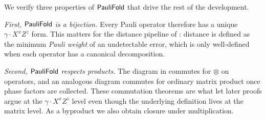%
%
%

We verify three properties of $\mathsf{PauliFold}$ that drive the rest of the
development.

\emph{First, $\mathsf{PauliFold}$ is a bijection.} Every Pauli operator therefore has a
unique $\gamma \cdot X^x Z^z$ form. This matters for the distance pipeline of
: distance is defined as the minimum \emph{Pauli weight}
of an undetectable error, which is only well-defined when each operator has a
canonical decomposition.

\emph{Second, $\mathsf{PauliFold}$ respects products.} The diagram in
 commutes for $\otimes$ on operators, and an analogous
diagram commutes for ordinary matrix product once phase factors are collected.
These commutation theorems are what let later proofs argue at the $\gamma \cdot
X^x Z^z$ level even though the underlying definition lives at the matrix level.
As a byproduct we also obtain closure under multiplication.

